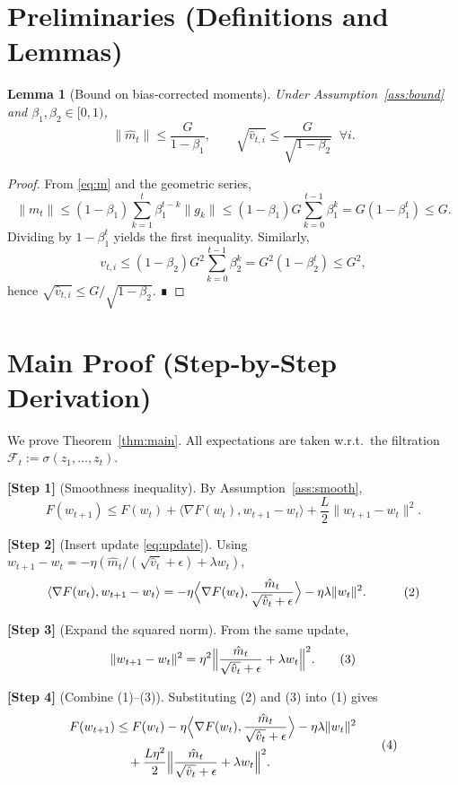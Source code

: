 \documentclass{article}
\newtheorem{lemma}{Lemma}
\begin{document}
\section*{Preliminaries (Definitions and Lemmas)}
\begin{lemma}[Bound on bias‑corrected moments]\label{lem:momentbound}
Under Assumption~\ref{ass:bound} and $\beta_1,\beta_2\in[0,1)$,
\[
\|\hat m_t\|\le \frac{G}{1-\beta_1},\qquad
\sqrt{\hat v_{t,i}}\le \frac{G}{\sqrt{1-\beta_2}}\;\;\forall i.
\]
\end{lemma}
\begin{proof}
From \eqref{eq:m} and the geometric series,
\[
\|m_t\|\le (1-\beta_1)\sum_{k=1}^t\beta_1^{t-k}\|g_k\|\le (1-\beta_1)G\sum_{k=0}^{t-1}\beta_1^{k}
=G(1-\beta_1^{t})\le G .
\]
Dividing by $1-\beta_1^{t}$ yields the first inequality.
Similarly,
\[
v_{t,i}\le (1-\beta_2)G^2\sum_{k=0}^{t-1}\beta_2^{k}
=G^2(1-\beta_2^{t})\le G^2,
\]
hence $\sqrt{\hat v_{t,i}}\le G/\sqrt{1-\beta_2}$. ∎
\end{proof}

\section*{Main Proof (Step‑by‑Step Derivation)}
We prove Theorem~\ref{thm:main}. All expectations are taken w.r.t.\ the filtration $\mathcal{F}_{t}:=\sigma(z_1,\dots,z_t)$.

\noindent\textbf{[Step 1]} (Smoothness inequality). By Assumption~\ref{ass:smooth},
\[
F(w_{t+1})\le F(w_t)+\langle\nabla F(w_t),w_{t+1}-w_t\rangle
+\frac{L}{2}\|w_{t+1}-w_t\|^2 . \tag{1}
\]

\noindent\textbf{[Step 2]} (Insert update \eqref{eq:update}). Using $w_{t+1}-w_t=-\eta(\hat m_t/(\sqrt{\hat v_t}+\epsilon)+\lambda w_t)$,
\[
\begin{aligned}
\langle\nabla F(w_t),w_{t+1}-w_t\rangle
&= -\eta\Bigl\langle\nabla F(w_t),\frac{\hat m_t}{\sqrt{\hat v_t}+\epsilon}\Bigr\rangle
-\eta\lambda\|w_t\|^2 .
\end{aligned} \tag{2}
\]

\noindent\textbf{[Step 3]} (Expand the squared norm). From the same update,
\[
\|w_{t+1}-w_t\|^2
= \eta^2\Bigl\|\frac{\hat m_t}{\sqrt{\hat v_t}+\epsilon}+\lambda w_t\Bigr\|^2 .
\tag{3}
\]

\noindent\textbf{[Step 4]} (Combine (1)–(3)). Substituting (2) and (3) into (1) gives
\[
\begin{aligned}
F(w_{t+1}) &\le F(w_t)-\eta\Bigl\langle\nabla F(w_t),\frac{\hat m_t}{\sqrt{\hat v_t}+\epsilon}\Bigr\rangle
-\eta\lambda\|w_t\|^2 \\
&\quad +\frac{L\eta^2}{2}\Bigl\|\frac{\hat m_t}{\sqrt{\hat v_t}+\epsilon}+\lambda w_t\Bigr\|^2 .
\end{aligned} \tag{4}
\]
\end{document}
